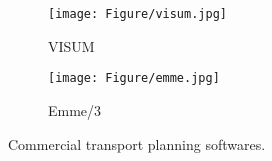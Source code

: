 \begin{figure}[h]
	\centering
	\begin{subfigure}[b]{0.4 \textwidth}
		\texttt{[image: Figure/visum.jpg]}
		\caption{VISUM} \label{fig:visum}
	\end{subfigure}
	\hspace*{0.6cm} %
	\begin{subfigure}[b]{0.5\textwidth}
		\texttt{[image: Figure/emme.jpg]}
		\caption{Emme/3} \label{fig:emme}
	\end{subfigure}
	\caption{Commercial transport planning softwares.} \label{fig:transport_software}
\end{figure}
